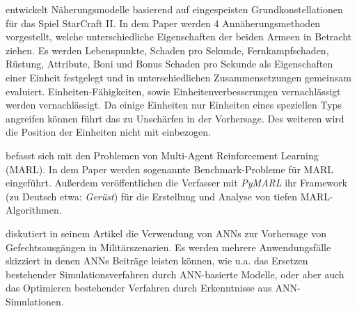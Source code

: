\textcite{DBLP:journals/corr/HelmkeKW14} entwickelt Näherungsmodelle basierend auf eingespeisten Grundkonstellationen für das Spiel StarCraft II. In dem Paper werden 4 Annäherungsmethoden vorgestellt, welche unterschiedliche Eigenschaften der beiden Armeen in Betracht ziehen. Es werden Lebenspunkte, Schaden pro Sekunde, Fernkampfschaden, Rüstung, Attribute, Boni und Bonus Schaden pro Sekunde als Eigenschaften einer Einheit festgelegt und in unterschiedlichen Zusammensetzungen gemeinsam evaluiert. Einheiten-Fähigkeiten, sowie Einheitenverbesserungen vernachlässigt werden vernachlässigt. Da einige Einheiten nur Einheiten eines speziellen Typs angreifen können führt das zu Unschärfen in der Vorhersage. Des weiteren wird die Position der Einheiten nicht mit einbezogen. 

\textcite{samvelyan2019starcraft} befasst sich mit den Problemen von Multi-Agent Reinforcement Learning (MARL). In dem Paper werden sogenannte Benchmark-Probleme für MARL eingeführt. Außerdem veröffentlichen die Verfasser mit \textit{PyMARL} ihr Framework (zu Deutsch etwa: \textit{Gerüst}) für die Erstellung und Analyse von tiefen MARL-Algorithmen. 

\textcite{Kilmer.1996} diskutiert in seinem Artikel die Verwendung von ANNs zur Vorhersage von Gefechtsausgängen in Militärszenarien. Es werden mehrere Anwendungsfälle skizziert in denen ANNs Beiträge leisten können, wie u.a. das Ersetzen bestehender Simulationsverfahren durch ANN-basierte Modelle, oder aber auch das Optimieren bestehender Verfahren durch Erkenntnisse aus ANN-Simulationen. 